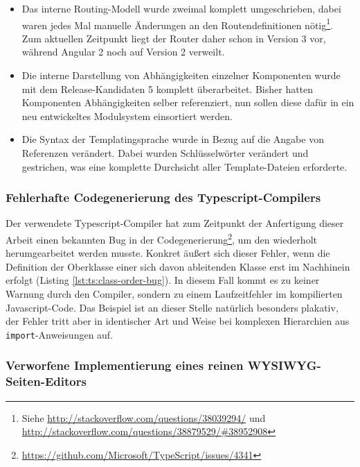 \begin{itemize}[noitemsep]
\item Das interne Routing-Modell wurde zweimal komplett umgeschrieben, dabei waren jedes Mal manuelle Änderungen an den Routendefinitionen nötig\footnote{Siehe \url{http://stackoverflow.com/questions/38039294/} und \\ \url{http://stackoverflow.com/questions/38879529/\#38952908}}. Zum aktuellen Zeitpunkt liegt der Router daher schon in Version 3 vor, während Angular 2 noch auf Version 2 verweilt.
\item Die interne Darstellung von Abhängigkeiten einzelner Komponenten wurde mit dem Release-Kandidaten 5 komplett überarbeitet. Bisher hatten Komponenten Abhängigkeiten selber referenziert, nun sollen diese dafür in ein neu entwickeltes Modulsystem einsortiert werden.
\item Die Syntax der Templatingsprache wurde in Bezug auf die Angabe von Referenzen verändert. Dabei wurden Schlüsselwörter verändert und gestrichen, was eine komplette Durchsicht aller Template-Dateien erforderte.
\end{itemize}

\subsubsection{Fehlerhafte Codegenerierung des Typescript-Compilers}

Der verwendete Typescript-Compiler hat zum Zeitpunkt der Anfertigung dieser Arbeit einen bekannten Bug in der Codegenerierung\footnote{\url{https://github.com/Microsoft/TypeScript/issues/4341}}, um den wiederholt herumgearbeitet werden musste. Konkret äußert sich dieser Fehler, wenn die Definition der Oberklasse einer sich davon ableitenden Klasse erst im Nachhinein erfolgt (Listing \ref{lst:ts:class-order-bug}). In diesem Fall kommt es zu keiner Warnung durch den Compiler, sondern zu einem Laufzeitfehler im kompilierten Javascript-Code. Das Beispiel ist an dieser Stelle natürlich besonders plakativ, der Fehler tritt aber in identischer Art und Weise bei komplexen Hierarchien aus \texttt{import}-Anweisungen auf.



\subsubsection{Verworfene Implementierung eines reinen WYSIWYG-Seiten-Editors}

